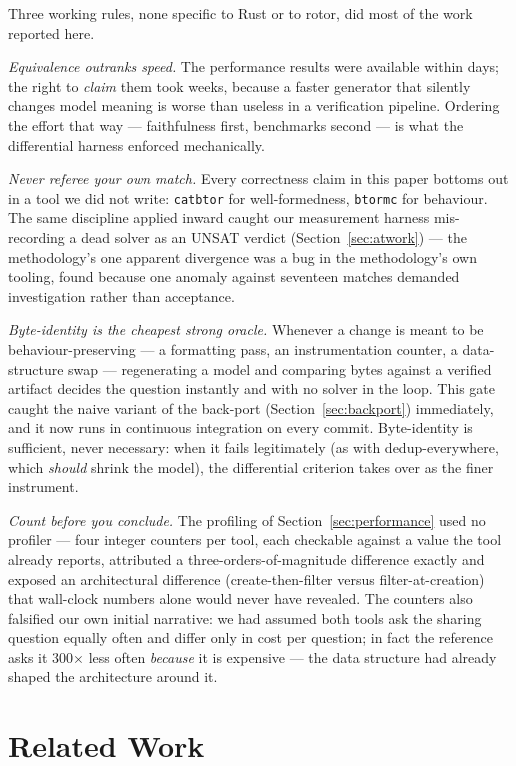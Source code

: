 \documentclass[sigplan,screen,nonacm]{acmart}
\begin{document}
Three working rules, none specific to Rust or to rotor, did most of the
work reported here.

\emph{Equivalence outranks speed.} The performance results were
available within days; the right to \emph{claim} them took weeks,
because a faster generator that silently changes model meaning is worse
than useless in a verification pipeline. Ordering the effort that way
--- faithfulness first, benchmarks second --- is what the differential
harness enforced mechanically.

\emph{Never referee your own match.} Every correctness claim in this
paper bottoms out in a tool we did not write: \texttt{catbtor} for
well-formedness, \texttt{btormc} for behaviour. The same discipline
applied inward caught our measurement harness mis-recording a dead
solver as an UNSAT verdict (Section~\ref{sec:atwork}) --- the
methodology's one apparent divergence was a bug in the methodology's
own tooling, found because one anomaly against seventeen matches
demanded investigation rather than acceptance.

\emph{Byte-identity is the cheapest strong oracle.} Whenever a change
is meant to be behaviour-preserving --- a formatting pass, an
instrumentation counter, a data-structure swap --- regenerating a model
and comparing bytes against a verified artifact decides the question
instantly and with no solver in the loop. This gate caught the naive
variant of the back-port (Section~\ref{sec:backport}) immediately, and
it now runs in continuous integration on every commit. Byte-identity is
sufficient, never necessary: when it fails legitimately (as with
dedup-everywhere, which \emph{should} shrink the model), the
differential criterion takes over as the finer instrument.

\emph{Count before you conclude.} The profiling of
Section~\ref{sec:performance} used no profiler --- four integer
counters per tool, each checkable against a value the tool already
reports, attributed a three-orders-of-magnitude difference exactly and
exposed an architectural difference (create-then-filter versus
filter-at-creation) that wall-clock numbers alone would never have
revealed. The counters also falsified our own initial narrative: we had
assumed both tools ask the sharing question equally often and differ
only in cost per question; in fact the reference asks it 300$\times$
less often \emph{because} it is expensive --- the data structure had
already shaped the architecture around it.

\section{Related Work}
\end{document}
